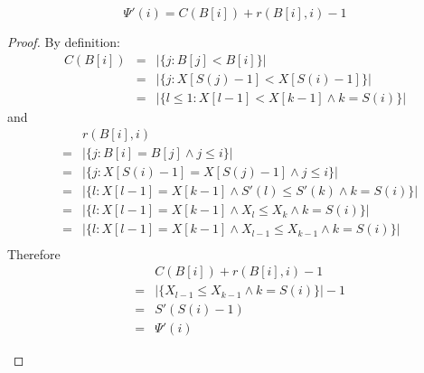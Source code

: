 \documentclass{bioinfo}
\begin{document}
\begin{methods}
\begin{thm}
\begin{equation}\label{eq:psii}
\Psi'(i)=C(B[i])+r(B[i],i)-1
\end{equation}
\end{thm}
\begin{proof}
By definition:
\begin{eqnarray*}
C(B[i])&=&\big|\{j:B[j]<B[i]\}\big|\\
&=&\big|\{j:X[S(j)-1]<X[S(i)-1]\}\big|\\
&=&\big|\{l\le1:X[l-1]<X[k-1]\land k=S(i)\}\big|
\end{eqnarray*}
and
\begin{eqnarray*}
&&r(B[i],i)\\
&=&\big|\{j:B[i]=B[j]\land j\le i\}\big|\\
&=&\big|\{j:X[S(i)-1]=X[S(j)-1]\land j\le i\}\big|\\
&=&\big|\{l:X[l-1]=X[k-1]\land S'(l)\le S'(k)\land k=S(i)\}\big|\\
&=&\big|\{l:X[l-1]=X[k-1]\land X_l\le X_k\land k=S(i)\}\big|\\
&=&\big|\{l:X[l-1]=X[k-1]\land X_{l-1}\le X_{k-1}\land k=S(i)\}\big|\\
\end{eqnarray*}
Therefore
\begin{eqnarray*}
&&C(B[i])+r(B[i],i)-1\\
&=&\big|\{X_{l-1}\le X_{k-1}\land k=S(i)\}\big|-1\\
&=&S'(S(i)-1)\\
&=&\Psi'(i)
\end{eqnarray*}
\begin{flushright}\qedsymbol\end{flushright}
\end{proof}


\end{methods}
\end{document}
